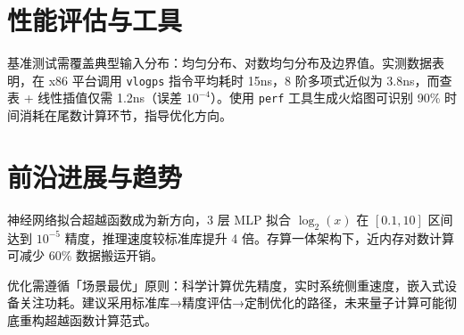 \chapter{性能评估与工具}
基准测试需覆盖典型输入分布：均匀分布、对数均匀分布及边界值。实测数据表明，在 x86 平台调用 \verb!vlogps! 指令平均耗时 15ns，8 阶多项式近似为 3.8ns，而查表 + 线性插值仅需 1.2ns（误差 $10^{-4}$）。使用 \verb!perf! 工具生成火焰图可识别 90\%{} 时间消耗在尾数计算环节，指导优化方向。\par
\chapter{前沿进展与趋势}
神经网络拟合超越函数成为新方向，3 层 MLP 拟合 $\log_2(x)$ 在 $[0.1,10]$ 区间达到 $10^{-5}$ 精度，推理速度较标准库提升 4 倍。存算一体架构下，近内存对数计算可减少 60\%{} 数据搬运开销。\par
优化需遵循「场景最优」原则：科学计算优先精度，实时系统侧重速度，嵌入式设备关注功耗。建议采用标准库→精度评估→定制优化的路径，未来量子计算可能彻底重构超越函数计算范式。\par
